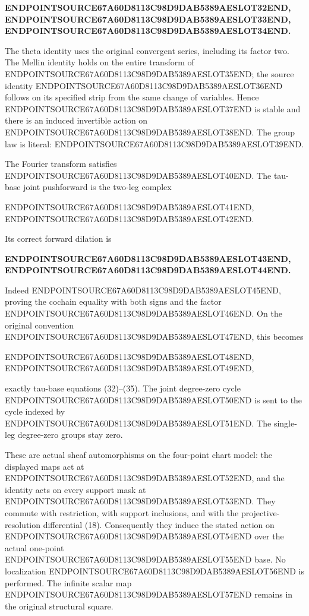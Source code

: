 \textbf{ENDPOINTSOURCE67A60D8113C98D9DAB5389AESLOT32END, ENDPOINTSOURCE67A60D8113C98D9DAB5389AESLOT33END, ENDPOINTSOURCE67A60D8113C98D9DAB5389AESLOT34END.}

The theta identity uses the original convergent series, including its factor two. The Mellin identity holds on the entire transform of ENDPOINTSOURCE67A60D8113C98D9DAB5389AESLOT35END; the source identity ENDPOINTSOURCE67A60D8113C98D9DAB5389AESLOT36END follows on its specified strip from the same change of variables. Hence ENDPOINTSOURCE67A60D8113C98D9DAB5389AESLOT37END is stable and there is an induced invertible action on ENDPOINTSOURCE67A60D8113C98D9DAB5389AESLOT38END. The group law is literal: ENDPOINTSOURCE67A60D8113C98D9DAB5389AESLOT39END.

The Fourier transform satisfies ENDPOINTSOURCE67A60D8113C98D9DAB5389AESLOT40END. The tau-base joint pushforward is the two-leg complex

ENDPOINTSOURCE67A60D8113C98D9DAB5389AESLOT41END, ENDPOINTSOURCE67A60D8113C98D9DAB5389AESLOT42END.

Its correct forward dilation is

\textbf{ENDPOINTSOURCE67A60D8113C98D9DAB5389AESLOT43END, ENDPOINTSOURCE67A60D8113C98D9DAB5389AESLOT44END.}

Indeed ENDPOINTSOURCE67A60D8113C98D9DAB5389AESLOT45END, proving the cochain equality with both signs and the factor ENDPOINTSOURCE67A60D8113C98D9DAB5389AESLOT46END. On the original convention ENDPOINTSOURCE67A60D8113C98D9DAB5389AESLOT47END, this becomes

ENDPOINTSOURCE67A60D8113C98D9DAB5389AESLOT48END, ENDPOINTSOURCE67A60D8113C98D9DAB5389AESLOT49END,

exactly tau-base equations (32)--(35). The joint degree-zero cycle ENDPOINTSOURCE67A60D8113C98D9DAB5389AESLOT50END is sent to the cycle indexed by ENDPOINTSOURCE67A60D8113C98D9DAB5389AESLOT51END. The single-leg degree-zero groups stay zero.

These are actual sheaf automorphisms on the four-point chart model: the displayed maps act at ENDPOINTSOURCE67A60D8113C98D9DAB5389AESLOT52END, and the identity acts on every support mask at ENDPOINTSOURCE67A60D8113C98D9DAB5389AESLOT53END. They commute with restriction, with support inclusions, and with the projective-resolution differential (18). Consequently they induce the stated action on ENDPOINTSOURCE67A60D8113C98D9DAB5389AESLOT54END over the actual one-point ENDPOINTSOURCE67A60D8113C98D9DAB5389AESLOT55END base. No localization ENDPOINTSOURCE67A60D8113C98D9DAB5389AESLOT56END is performed. The infinite scalar map ENDPOINTSOURCE67A60D8113C98D9DAB5389AESLOT57END remains in the original structural square.

